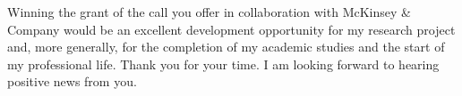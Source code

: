 \documentclass[11pt, a4paper]{awesome-cv}
\begin{document}
\begin{cvletter}
Winning the grant of the call you offer in collaboration with McKinsey \& Company would be an excellent development opportunity for my research project and, more generally, for the completion of my academic studies and the start of my professional life.
Thank you for your time. I am looking forward to hearing positive news from you.

\end{cvletter}


\makeletterclosing
\end{document}
